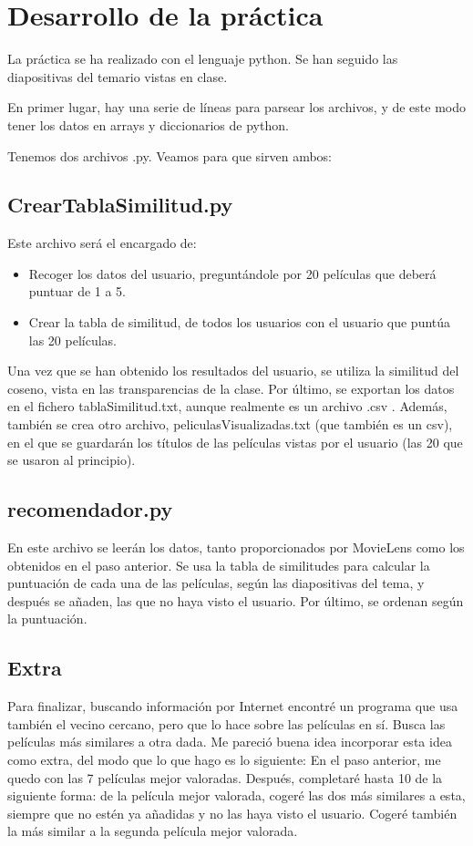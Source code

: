 \section{Desarrollo de la práctica}
La práctica se ha realizado con el lenguaje python. Se han seguido las diapositivas del temario vistas en clase.

En primer lugar, hay una serie de líneas para parsear los archivos, y de este modo tener los datos en arrays y diccionarios de python.

Tenemos dos archivos .py. Veamos para que sirven ambos:

\subsection{CrearTablaSimilitud.py}
Este archivo será el encargado de:
\begin{itemize}
	\item Recoger los datos del usuario, preguntándole por 20 películas que deberá puntuar de 1 a 5.
	\item Crear la tabla de similitud, de todos los usuarios con el usuario que puntúa las 20 películas. 
\end{itemize}

Una vez que se han obtenido los resultados del usuario, se utiliza la similitud del coseno, vista en las transparencias de la clase. Por último, se exportan los datos en el fichero tablaSimilitud.txt, aunque realmente es un archivo .csv . Además, también se crea otro archivo, peliculasVisualizadas.txt (que también es un csv), en el que se guardarán los títulos de las películas vistas por el usuario (las 20 que se usaron al principio).

\subsection{recomendador.py}

En este archivo se leerán los datos, tanto proporcionados por MovieLens como los obtenidos en el paso anterior. Se usa la tabla de similitudes para calcular la puntuación de cada una de las películas, según las diapositivas del tema, y después se añaden, las que no haya visto el usuario. Por último, se ordenan según la puntuación.

\subsection{Extra}

Para finalizar, buscando información por Internet  encontré un programa que usa también el vecino cercano, pero que lo hace sobre las películas en sí. Busca las películas más similares a otra dada. Me pareció buena idea incorporar esta idea como extra, del modo que lo que hago es lo siguiente: En el paso anterior, me quedo con las 7 películas mejor valoradas. Después, completaré hasta 10 de la siguiente forma: de la película mejor valorada, cogeré las dos más similares a esta, siempre que no estén ya añadidas y no las haya visto el usuario. Cogeré también la más similar a la segunda película mejor valorada.

